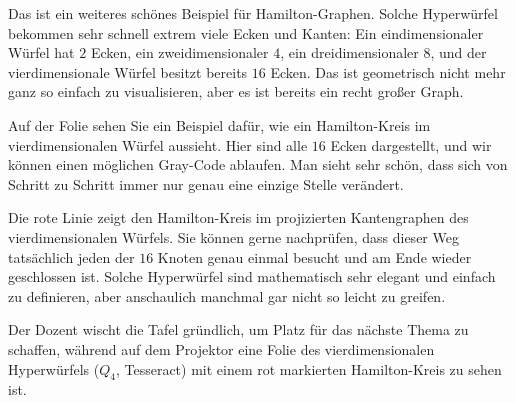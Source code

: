 \begin{spoken-clean}[00:52:40 - 00:54:38]
Das ist ein weiteres schönes Beispiel für Hamilton-Graphen. Solche Hyperwürfel bekommen sehr schnell extrem viele Ecken und Kanten: Ein eindimensionaler Würfel hat $2$ Ecken, ein zweidimensionaler $4$, ein dreidimensionaler $8$, und der vierdimensionale Würfel besitzt bereits $16$ Ecken. Das ist geometrisch nicht mehr ganz so einfach zu visualisieren, aber es ist bereits ein recht großer Graph.

Auf der Folie sehen Sie ein Beispiel dafür, wie ein Hamilton-Kreis im vierdimensionalen Würfel aussieht. Hier sind alle $16$ Ecken dargestellt, und wir können einen möglichen Gray-Code ablaufen. Man sieht sehr schön, dass sich von Schritt zu Schritt immer nur genau eine einzige Stelle verändert.

Die rote Linie zeigt den Hamilton-Kreis im projizierten Kantengraphen des vierdimensionalen Würfels. Sie können gerne nachprüfen, dass dieser Weg tatsächlich jeden der $16$ Knoten genau einmal besucht und am Ende wieder geschlossen ist. Solche Hyperwürfel sind mathematisch sehr elegant und einfach zu definieren, aber anschaulich manchmal gar nicht so leicht zu greifen.
\end{spoken-clean}

\begin{meta-note}[Tafelreinigung]
Der Dozent wischt die Tafel gründlich, um Platz für das nächste Thema zu schaffen, während auf dem Projektor eine Folie des vierdimensionalen Hyperwürfels ($Q_4$, Tesseract) mit einem rot markierten Hamilton-Kreis zu sehen ist.
\end{meta-note}

  
  
